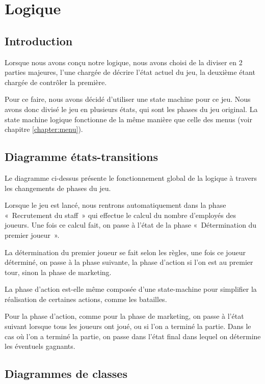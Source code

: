 \chapter{Logique} \label{chapter:logique}
\section{Introduction}
Lorsque nous avons conçu notre logique, nous avons choisi de la diviser en 2
parties majeures, l'une chargée de décrire l'état actuel du jeu, la deuxième
étant chargée de contrôler la première.

Pour ce faire, nous avons décidé d'utiliser une state machine pour ce jeu.
Nous avons donc divisé le jeu en plusieurs états, qui sont les phases du jeu original.
La state machine logique fonctionne de la même manière que celle des menus (voir chapitre \ref{chapter:menu}).

\section{Diagramme états-transitions}


Le diagramme ci-dessus présente le fonctionnement global de la logique à travers
les changements de phases du jeu.

Lorsque le jeu est lancé, nous rentrons automatiquement dans la phase « Recrutement du staff »
qui effectue le calcul du nombre d'employés des joueurs.
Une fois ce calcul fait, on passe à l'état de la phase « Détermination du premier joueur ».

La détermination du premier joueur se fait selon les règles, une fois ce joueur
déterminé, on passe à la phase suivante, la phase d'action si l'on est au premier
tour, sinon la phase de marketing.

La phase d'action est-elle même composée d'une state-machine pour simplifier la
réalisation de certaines actions, comme les batailles.

Pour la phase d'action, comme pour la phase de marketing, on passe à l'état
suivant lorsque tous les joueurs ont joué, ou si l'on a terminé la partie.
Dans le cas où l'on a terminé la partie, on passe dans l'état final dans lequel
on détermine les éventuels gagnants.

\section{Diagrammes de classes}
